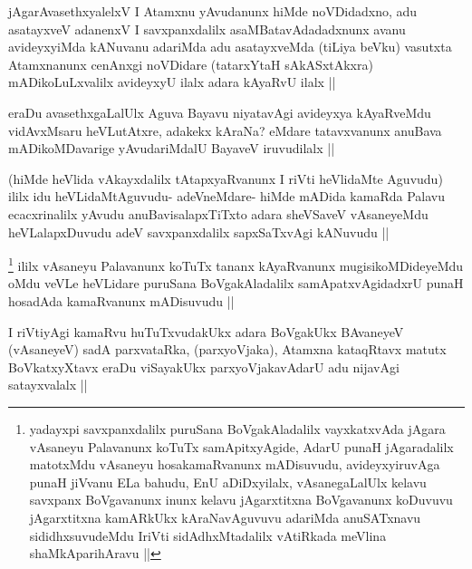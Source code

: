 
\begin{artha}
jAgarAvasethxyalelxV I Atamxnu yAvudanunx hiMde noVDidadxno, adu asatayxveV adanenxV I savxpanxdalilx asaMBatavAdadadxnunx avanu avideyxyiMda kANuvanu adariMda adu asatayxveMda (tiLiya beVku) vasutxta Atamxnanunx cenAnxgi noVDidare (tatarxYtaH sAkASxtAkxra) mADikoLuLxvalilx avideyxyU ilalx adara kAyaRvU ilalx ||
\end{artha}

\begin{artha}
eraDu avasethxgaLalUlx Aguva Bayavu niyatavAgi avideyxya kAyaRveMdu vidAvxMsaru heVLutAtxre, adakekx kAraNa? eMdare tatavxvanunx anuBava mADikoMDavarige yAvudariMdalU BayaveV iruvudilalx ||
\end{artha}

\begin{artha}
(hiMde heVlida vAkayxdalilx tAtapxyaRvanunx I riVti heVlidaMte Aguvudu) ililx idu heVLidaMtAguvudu- adeVneMdare- hiMde mADida kamaRda Palavu ecacxrinalilx yAvudu anuBavisalapxTiTxto adara sheVSaveV vAsaneyeMdu heVLalapxDuvudu adeV savxpanxdalilx sapxSaTxvAgi kANuvudu ||
\end{artha}


\begin{artha}
\footnote{yadayxpi savxpanxdalilx puruSana BoVgakAladalilx vayxkatxvAda jAgara vAsaneyu Palavanunx koTuTx samApitxyAgide, AdarU punaH jAgaradalilx matotxMdu vAsaneyu hosakamaRvanunx mADisuvudu, avideyxyiruvAga punaH jiVvanu ELa bahudu, EnU aDiDxyilalx, vAsanegaLalUlx kelavu savxpanx BoVgavanunx inunx kelavu jAgarxtitxna BoVgavanunx koDuvuvu jAgarxtitxna kamARkUkx kAraNavAguvuvu adariMda anuSATxnavu sididhxsuvudeMdu IriVti sidAdhxMtadalilx vAtiRkada meVlina shaMkAparihAravu ||}
ililx vAsaneyu Palavanunx koTuTx tananx kAyaRvanunx mugisikoMDideyeMdu oMdu veVLe heVLidare puruSana BoVgakAladalilx samApatxvAgidadxrU punaH hosadAda kamaRvanunx mADisuvudu ||
\end{artha}

\begin{artha}
I riVtiyAgi kamaRvu huTuTxvudakUkx adara BoVgakUkx BAvaneyeV (vAsaneyeV) sadA parxvataRka, (parxyoVjaka), Atamxna kataqRtavx matutx BoVkatxyXtavx eraDu viSayakUkx parxyoVjakavAdarU adu nijavAgi satayxvalalx ||
\end{artha}

